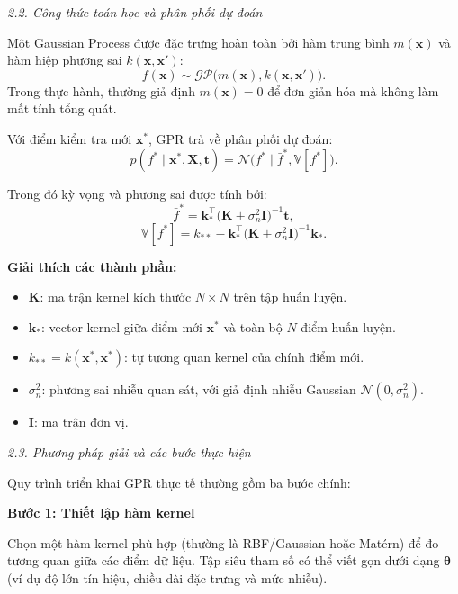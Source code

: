 \noindent\textcolor{infocolor}{\textit{2.2. Công thức toán học và phân phối dự đoán}}

Một Gaussian Process được đặc trưng hoàn toàn bởi hàm trung bình $m(\mathbf{x})$ và hàm hiệp phương sai $k(\mathbf{x},\mathbf{x}')$:
\begin{equation}
    f(\mathbf{x}) \sim \mathcal{GP}\big(m(\mathbf{x}),k(\mathbf{x},\mathbf{x}')\big).
\end{equation}
Trong thực hành, thường giả định $m(\mathbf{x})=0$ để đơn giản hóa mà không làm mất tính tổng quát.

Với điểm kiểm tra mới $\mathbf{x}^*$, GPR trả về phân phối dự đoán:
\begin{equation}
    p(f^*\mid \mathbf{x}^*,\mathbf{X},\mathbf{t})=\mathcal{N}\big(f^*\mid \bar f^*,\mathbb{V}[f^*]\big).
\end{equation}

Trong đó kỳ vọng và phương sai được tính bởi:
\begin{equation}
    \bar f^* = \mathbf{k}_*^\top\big(\mathbf{K}+\sigma_n^2\mathbf{I}\big)^{-1}\mathbf{t},
\end{equation}
\begin{equation}
    \mathbb{V}[f^*] = k_{**}-\mathbf{k}_*^\top\big(\mathbf{K}+\sigma_n^2\mathbf{I}\big)^{-1}\mathbf{k}_*.
\end{equation}

\textbf{Giải thích các thành phần:}
\begin{itemize} [labelsep=10pt, leftmargin=2cm]
    \item $\mathbf{K}$: ma trận kernel kích thước $N\times N$ trên tập huấn luyện.
    \item $\mathbf{k}_*$: vector kernel giữa điểm mới $\mathbf{x}^*$ và toàn bộ $N$ điểm huấn luyện.
    \item $k_{**}=k(\mathbf{x}^*,\mathbf{x}^*)$: tự tương quan kernel của chính điểm mới.
    \item $\sigma_n^2$: phương sai nhiễu quan sát, với giả định nhiễu Gaussian $\mathcal{N}(0,\sigma_n^2)$.
    \item $\mathbf{I}$: ma trận đơn vị.
\end{itemize}

\noindent\textcolor{infocolor}{\textit{2.3. Phương pháp giải và các bước thực hiện}}

Quy trình triển khai GPR thực tế thường gồm ba bước chính:

\textbf{Bước 1: Thiết lập hàm kernel}

Chọn một hàm kernel phù hợp (thường là RBF/Gaussian hoặc Mat\'ern) để đo tương quan giữa các điểm dữ liệu. Tập siêu tham số có thể viết gọn dưới dạng $\boldsymbol{\theta}$ (ví dụ độ lớn tín hiệu, chiều dài đặc trưng và mức nhiễu).

